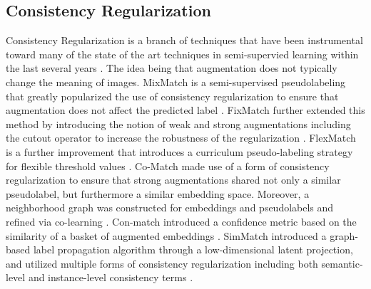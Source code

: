 \documentclass[10pt,twocolumn,letterpaper]{article}
\begin{document}
\subsection{Consistency Regularization}

Consistency Regularization is a branch of techniques that have been instrumental toward many of the state of the art techniques in semi-supervied learning within the last several years \cite{berthelot2019mixmatch, berthelot2019remixmatch, sohn2020fixmatch, zhang2021flexmatch, li2021comatch, kim2022conmatch, zheng2022simmatch, zheng2023simmatchv2}.  The idea being that augmentation does not typically change the meaning of images.  MixMatch is a semi-supervised pseudolabeling that greatly popularized the use of consistency regularization to ensure that augmentation does not affect the predicted label \cite{berthelot2019mixmatch, berthelot2019remixmatch}.  FixMatch further extended this method by introducing the notion of weak and strong augmentations including the cutout operator to increase the robustness of the regularization \cite{sohn2020fixmatch}.  FlexMatch is a further improvement that introduces a curriculum pseudo-labeling strategy for flexible threshold values \cite{zhang2021flexmatch}.  Co-Match made use of a form of consistency regularization to ensure that strong augmentations shared not only a similar pseudolabel, but furthermore a similar embedding space.  Moreover, a neighborhood graph was constructed for embeddings and pseudolabels and refined via co-learning \cite{li2021comatch}.  Con-match introduced a confidence metric based on the similarity of a basket of augmented embeddings \cite{kim2022conmatch}.  SimMatch introduced a graph-based label propagation algorithm through a low-dimensional latent projection, and utilized multiple forms of consistency regularization including both semantic-level and instance-level consistency terms \cite{zheng2022simmatch, zheng2023simmatchv2}.  

\end{document}
